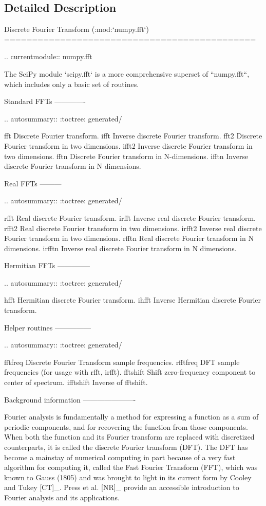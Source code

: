 \subsection{Detailed Description}
\begin{DoxyVerb}Discrete Fourier Transform (:mod:`numpy.fft`)
=============================================

.. currentmodule:: numpy.fft

The SciPy module `scipy.fft` is a more comprehensive superset
of ``numpy.fft``, which includes only a basic set of routines.

Standard FFTs
-------------

.. autosummary::
   :toctree: generated/

   fft       Discrete Fourier transform.
   ifft      Inverse discrete Fourier transform.
   fft2      Discrete Fourier transform in two dimensions.
   ifft2     Inverse discrete Fourier transform in two dimensions.
   fftn      Discrete Fourier transform in N-dimensions.
   ifftn     Inverse discrete Fourier transform in N dimensions.

Real FFTs
---------

.. autosummary::
   :toctree: generated/

   rfft      Real discrete Fourier transform.
   irfft     Inverse real discrete Fourier transform.
   rfft2     Real discrete Fourier transform in two dimensions.
   irfft2    Inverse real discrete Fourier transform in two dimensions.
   rfftn     Real discrete Fourier transform in N dimensions.
   irfftn    Inverse real discrete Fourier transform in N dimensions.

Hermitian FFTs
--------------

.. autosummary::
   :toctree: generated/

   hfft      Hermitian discrete Fourier transform.
   ihfft     Inverse Hermitian discrete Fourier transform.

Helper routines
---------------

.. autosummary::
   :toctree: generated/

   fftfreq   Discrete Fourier Transform sample frequencies.
   rfftfreq  DFT sample frequencies (for usage with rfft, irfft).
   fftshift  Shift zero-frequency component to center of spectrum.
   ifftshift Inverse of fftshift.


Background information
----------------------

Fourier analysis is fundamentally a method for expressing a function as a
sum of periodic components, and for recovering the function from those
components.  When both the function and its Fourier transform are
replaced with discretized counterparts, it is called the discrete Fourier
transform (DFT).  The DFT has become a mainstay of numerical computing in
part because of a very fast algorithm for computing it, called the Fast
Fourier Transform (FFT), which was known to Gauss (1805) and was brought
to light in its current form by Cooley and Tukey [CT]_.  Press et al. [NR]_
provide an accessible introduction to Fourier analysis and its
applications.


\end{DoxyVerb}
